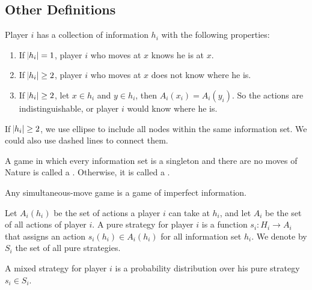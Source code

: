 \subsection{Other Definitions}

\begin{definition}
    Player $i$ has a collection of information $h_i$ with the following properties:
    \begin{enumerate}
        \item If $\abs{h_i} = 1$, player $i$ who moves at $x$ knows he is at $x$.
        \item If $\abs{h_i} \geq 2$, player $i$ who moves at $x$ does not know where he is.
        \item If $\abs{h_i} \geq 2$, let $x \in h_i$ and $y \in h_i$, then $A_i(x_i) = A_i(y_i)$. So the actions are indistinguishable, or player $i$ would know where he is.
    \end{enumerate}
    
    If $\abs{h_i} \geq 2$, we use ellipse to include all nodes within the same information set. We could also use dashed lines to connect them.
\end{definition}

\begin{definition}
    A game in which every information set is a singleton and there are no moves of Nature is called a . Otherwise, it is called a .
\end{definition}

\begin{theorem}
    Any simultaneous-move game is a game of imperfect information.    
\end{theorem}

\begin{definition}
    Let $A_i(h_i)$ be the set of actions a player $i$ can take at $h_i$, and let $A_i$ be the set of all actions of player $i$. A pure strategy for player $i$ is a function $s_i: H_i \rightarrow A_i$ that assigns an action $s_i(h_i) \in A_i(h_i)$ for all information set $h_i$. We denote by $S_i$ the set of all pure strategies.
\end{definition}

\begin{definition}
    A mixed strategy for player $i$ is a probability distribution over his pure strategy $s_i \in S_i$.
\end{definition}

